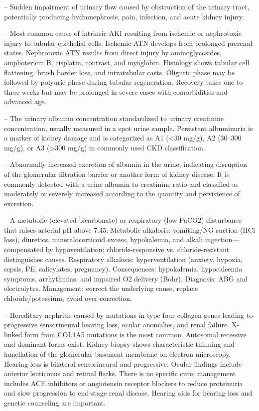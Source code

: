 -- Sudden impairment of urinary flow caused by obstruction of the urinary tract, potentially producing hydronephrosis, pain, infection, and acute kidney injury.

-- Most common cause of intrinsic AKI resulting from ischemic or nephrotoxic injury to tubular epithelial cells. Ischemic ATN develops from prolonged prerenal states. Nephrotoxic ATN results from direct injury by aminoglycosides, amphotericin B, cisplatin, contrast, and myoglobin. Histology shows tubular cell flattening, brush border loss, and intratubular casts. Oliguric phase may be followed by polyuric phase during tubular regeneration. Recovery takes one to three weeks but may be prolonged in severe cases with comorbidities and advanced age.

-- The urinary albumin concentration standardized to urinary creatinine concentration, usually measured in a spot urine sample. Persistent albuminuria is a marker of kidney damage and is categorized as A1 (<30 mg/g), A2 (30--300 mg/g), or A3 (>300 mg/g) in commonly used CKD classification.

-- Abnormally increased excretion of albumin in the urine, indicating disruption of the glomerular filtration barrier or another form of kidney disease. It is commonly detected with a urine albumin-to-creatinine ratio and classified as moderately or severely increased according to the quantity and persistence of excretion.

-- A metabolic (elevated bicarbonate) or respiratory (low PaCO2) disturbance that raises arterial pH above 7.45. Metabolic alkalosis: vomiting/NG suction (HCl loss), diuretics, mineralocorticoid excess, hypokalemia, and alkali ingestion—compensated by hypoventilation; chloride-responsive vs. chloride-resistant distinguishes causes. Respiratory alkalosis: hyperventilation (anxiety, hypoxia, sepsis, PE, salicylates, pregnancy). Consequences: hypokalemia, hypocalcemia symptoms, arrhythmias, and impaired O2 delivery (Bohr). Diagnosis: ABG and electrolytes. Management: correct the underlying cause, replace chloride/potassium, avoid over-correction.

-- Hereditary nephritis caused by mutations in type four collagen genes leading to progressive sensorineural hearing loss, ocular anomalies, and renal failure. X-linked form from COL4A5 mutations is the most common. Autosomal recessive and dominant forms exist. Kidney biopsy shows characteristic thinning and lamellation of the glomerular basement membrane on electron microscopy. Hearing loss is bilateral sensorineural and progressive. Ocular findings include anterior lenticonus and retinal flecks. There is no specific cure; management includes ACE inhibitors or angiotensin receptor blockers to reduce proteinuria and slow progression to end-stage renal disease. Hearing aids for hearing loss and genetic counseling are important.

